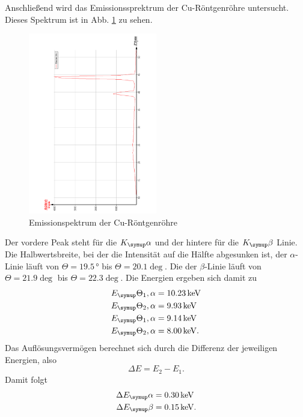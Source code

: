 Anschließend wird das Emissionssprektrum der Cu-Röntgenröhre untersucht.
Dieses Spektrum ist in Abb. \ref{fig:EmissionCu} zu sehen.
\begin{figure}
  \centering
  \includegraphics[width=0.5\textwidth, angle=270]{bilder/EmissionCu.pdf}
  \caption{Emissionspektrum der Cu-Röntgenröhre}
  \label{fig:EmissionCu}
\end{figure}
Der vordere Peak steht für die $K_\su{\alpha}$ und der hintere für die $K_\su{\beta}$
Linie. Die Halbwertsbreite, bei der die Intensität auf die Hälfte abgesunken ist,
der $\alpha$-Linie läuft von $\Theta = 19.5\,\si{\degree}$ bis $\Theta = 20.1\deg$.
Die der $\beta$-Linie läuft von $\Theta = 21.9\deg$ bis $\Theta = 22.3\deg$.
Die Energien ergeben sich damit zu
\begin{align}
  E_\su{\Theta_1, \alpha} &= 10.23 \keV \\
  E_\su{\Theta_2, \alpha} &= 9.93 \keV \\
  E_\su{\Theta_1, \alpha} &= 9.14 \keV \\
  E_\su{\Theta_2, \alpha} &= 8.00 \keV. \\
\end{align}
Das Auflösungsvermögen berechnet sich durch die Differenz der jeweiligen Energien,
also
\begin{equation}
  \Delta E = E_2 - E_1.
\end{equation}
Damit folgt
\begin{align}
  \Delta E_\su{\alpha} &= 0.30 \keV  \\
  \Delta E_\su{\beta} &= 0.15 \keV. \\
\end{align}





